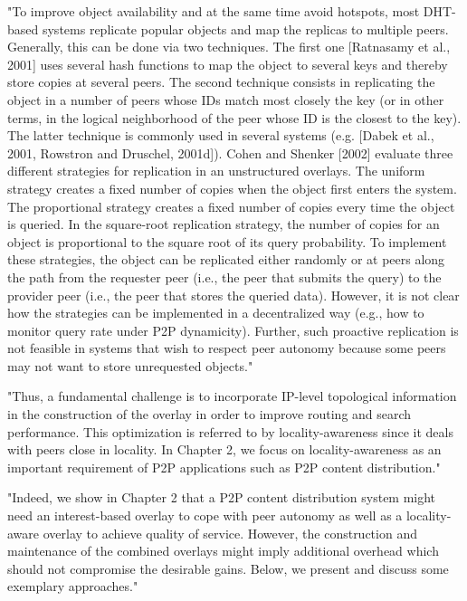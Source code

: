 "To improve object availability and at the same time avoid hotspots, most DHT-based systems replicate popular objects and map the replicas to multiple peers.
Generally, this can be done via two techniques.
The first one [Ratnasamy et al., 2001] uses several hash functions to map the object to several keys and thereby store copies at several peers.
The second technique consists in replicating the object in a number of peers whose IDs match most closely the key (or in other terms, in the logical neighborhood of the peer whose ID is the closest to the key).
The latter technique is commonly used in several systems (e.g. [Dabek et al., 2001, Rowstron and Druschel, 2001d]).
Cohen and Shenker [2002] evaluate three different strategies for replication in an unstructured overlays.
The uniform strategy creates a fixed number of copies when the object first enters the system.
The proportional strategy creates a fixed number of copies every time the object is queried.
In the square-root replication strategy, the number of copies for an object is proportional to the square root of its query probability.
To implement these strategies, the object can be replicated either randomly or at peers along the path from the requester peer (i.e., the peer that submits the query) to the provider peer (i.e., the peer that stores the queried data).
However, it is not clear how the strategies can be implemented in a decentralized way (e.g., how to monitor query rate under P2P dynamicity).
Further, such proactive replication is not feasible in systems that wish to respect peer autonomy because some peers may not want to store unrequested objects."\cite{book:p2p-mob}

"Thus, a fundamental challenge is to incorporate IP-level topological information in the construction of the overlay in order to improve routing and search performance.
This optimization is referred to by locality-awareness since it deals with peers close in locality.
In Chapter 2, we focus on locality-awareness as an important requirement of P2P applications such as P2P content distribution."\cite{book:p2p-mob}

"Indeed, we show in Chapter 2 that a P2P content distribution system might need an interest-based overlay to cope with peer autonomy as well as a locality-aware overlay to achieve quality of service.
However, the construction and maintenance of the combined overlays might imply additional overhead which should not compromise the desirable gains.
Below, we present and discuss some exemplary approaches."\cite{book:p2p-mob}

